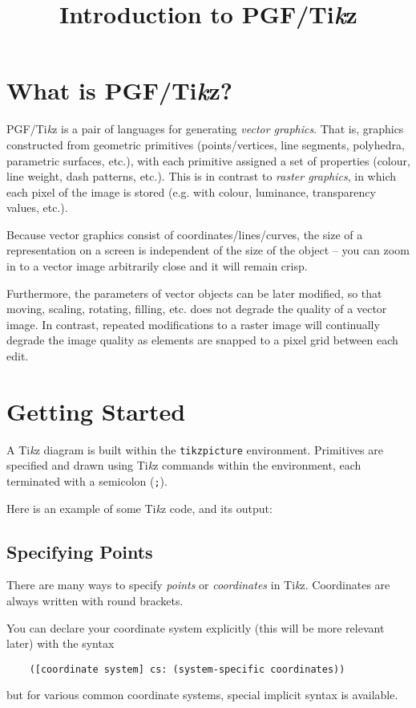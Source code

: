\documentclass{article}
\theoremstyle{definition}
\theoremstyle{definition}
\theoremstyle{remark}
\newcommand{\Tikz}{Ti\textit{k}z{}}
\begin{document}
\title{Introduction to PGF/\Tikz{}}

\newpage

\section*{What is PGF/\Tikz{}?}

PGF/\Tikz{} is a pair of languages for generating \textit{vector graphics}. That is, graphics constructed from geometric primitives (points/vertices, line segments, polyhedra, parametric surfaces, etc.), with each primitive assigned a set of properties (colour, line weight, dash patterns, etc.). This is in contrast to \textit{raster graphics}, in which each pixel of the image is stored (e.g. with colour, luminance, transparency values, etc.).

Because vector graphics consist of coordinates/lines/curves, the size of a representation on a screen is independent of the size of the object -- you can zoom in to a vector image arbitrarily close and it will remain crisp.

Furthermore, the parameters of vector objects can be later modified, so that moving, scaling, rotating, filling, etc. does not degrade the quality of a vector image. In contrast, repeated modifications to a raster image will continually degrade the image quality as elements are snapped to a pixel grid between each edit.

\section*{Getting Started}

A \Tikz{} diagram is built within the \verb|tikzpicture| environment. Primitives are specified and drawn using \Tikz{} commands within the environment, each terminated with a semicolon (\verb|;|).

Here is an example of some \Tikz{} code, and its output:


\subsection*{Specifying Points}

There are many ways to specify \textit{points} or \textit{coordinates} in \Tikz{}. Coordinates are always written with round brackets.

You can declare your coordinate system explicitly (this will be more relevant later) with the syntax
\begin{verbatim}
    ([coordinate system] cs: (system-specific coordinates))
\end{verbatim}
but for various common coordinate systems, special implicit syntax is available.
\end{document}
